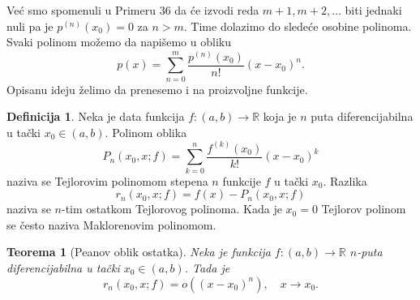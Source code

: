 \documentclass[a4paper,12pt]{article}
\theoremstyle{plain}
\newtheorem{theorem}{Teorema}[section]
\theoremstyle{definition}
\newtheorem{definition}{Definicija}[section]
\theoremstyle{remark}
\begin{document}
Već smo spomenuli u Primeru 36 da će izvodi reda $m + 1, m + 2, \dots$ biti jednaki nuli pa je $p^{(n)}(x_0) = 0$ za $n > m$. Time dolazimo do sledeće osobine polinoma. Svaki polinom možemo da napišemo u obliku
$$
p(x) = \sum_{n=0}^{m} \frac{p^{(n)}(x_0)}{n!}(x - x_0)^n.
$$
Opisanu ideju želimo da prenesemo i na proizvoljne funkcije.

\begin{definition}
Neka je data funkcija $f: (a, b) \to \mathbb{R}$ koja je $n$ puta diferencijabilna u tački $x_0 \in (a, b)$. Polinom oblika
$$
P_n(x_0, x; f) = \sum_{k=0}^{n} \frac{f^{(k)}(x_0)}{k!}(x - x_0)^k
$$
naziva se Tejlorovim polinomom stepena $n$ funkcije $f$ u tački $x_0$. Razlika
$$
r_n(x_0, x; f) = f(x) - P_n(x_0, x; f)
$$
naziva se $n$-tim ostatkom Tejlorovog polinoma. Kada je $x_0 = 0$ Tejlorov polinom se često naziva Maklorenovim polinomom.
\end{definition}

\begin{theorem}[Peanov oblik ostatka]
Neka je funkcija $f: (a,b) \to \mathbb{R}$ $n$-puta diferencijabilna u tački $x_0 \in (a, b)$. Tada je
$$
r_n(x_0, x; f) = o((x - x_0)^n), \quad x \to x_0.
$$
\end{theorem}
\end{document}
